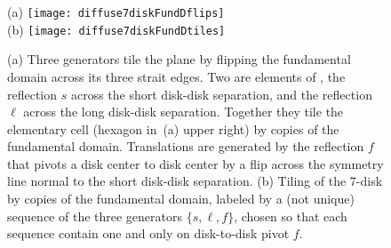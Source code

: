 

\begin{figure}[htbp]
  \begin{center}
    (a) \texttt{[image: diffuse7diskFundDflips]}
    \\
    (b) \texttt{[image: diffuse7diskFundDtiles]}
  \end{center}
  \caption{\label{fig-7diskFundDflips}
  (a) Three generators tile the plane by flipping the fundamental domain
  across its three strait edges. Two are elements of , the
  reflection  $s$ across the short disk-disk separation, and the
  reflection $\ell$ across the long disk-disk separation. Together they
  tile the elementary cell (hexagon in \,(a)
  upper right) by copies of the fundamental domain. Translations are
  generated by the reflection $f$ that pivots a  disk center to disk
  center by a flip across the symmetry line normal to the short disk-disk
  separation.
  (b) Tiling of the 7-disk by copies of the fundamental domain, labeled
  by a (not unique) sequence of the three generators  $\{s,\ell,f\}$,
  chosen so that each sequence contain one and only on  disk-to-disk
  pivot $f$.
  }
\end{figure}

